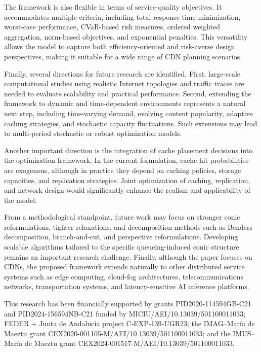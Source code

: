 \documentclass[a4paper,11pt,reqno]{amsart}
\begin{document}
The framework is also flexible in terms of service-quality objectives. It accommodates multiple criteria, including total response time minimization, worst-case performance, CVaR-based risk measures, ordered weighted aggregation, norm-based objectives, and exponential penalties. This versatility allows the model to capture both efficiency-oriented and risk-averse design perspectives, making it suitable for a wide range of CDN planning scenarios.

Finally, several directions for future research are identified. First, large-scale computational studies using realistic Internet topologies and traffic traces are needed to evaluate scalability and practical performance. Second, extending the framework to dynamic and time-dependent environments represents a natural next step, including time-varying demand, evolving content popularity, adaptive caching strategies, and stochastic capacity fluctuations. Such extensions may lead to multi-period stochastic or robust optimization models.

Another important direction is the integration of cache placement decisions into the optimization framework. In the current formulation, cache-hit probabilities are exogenous, although in practice they depend on caching policies, storage capacities, and replication strategies. Joint optimization of caching, replication, and network design would significantly enhance the realism and applicability of the model.

From a methodological standpoint, future work may focus on stronger conic reformulations, tighter relaxations, and decomposition methods such as Benders decomposition, branch-and-cut, and perspective reformulations. Developing scalable algorithms tailored to the specific queueing-induced conic structure remains an important research challenge. Finally, although the paper focuses on CDNs, the proposed framework extends naturally to other distributed service systems such as edge computing, cloud-fog architectures, telecommunications networks, transportation systems, and latency-sensitive AI inference platforms.

\vspace*{0.4cm}

This research has been financially supported by grants PID2020-114594GB-C21 and PID2024-156594NB-C21 funded by MICIU/AEI/10.13039/501100011033; FEDER + Junta de Andaluc\'ia project C‐EXP‐139‐UGR23; the IMAG--Mar\'ia de Maeztu grant CEX2020-001105-M/AEI/10.13039/501100011033; and the IMUS--Mar\'ia de Maeztu grant CEX2024-001517-M/AEI/10.13039/501100011033.
\end{document}

